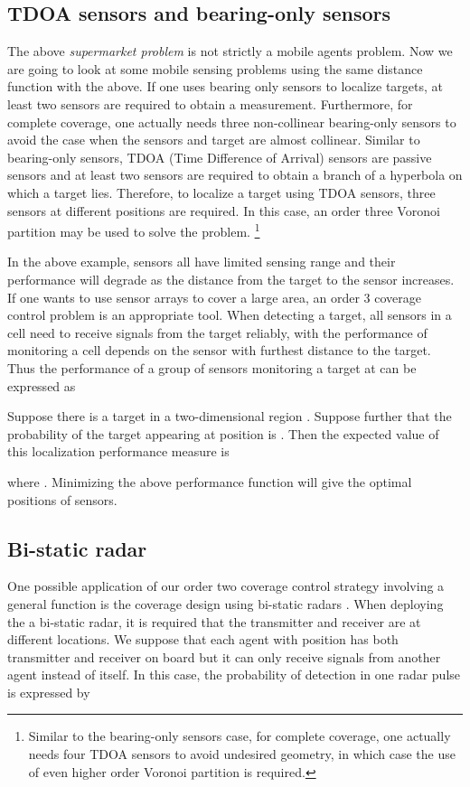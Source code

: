 \documentclass[letterpaper, 10 pt, conference]{ieeeconf}
\begin{document}
\subsection{TDOA sensors and bearing-only sensors}
The above \textit{supermarket problem} is not strictly a mobile agents problem. Now we are going to look at some mobile sensing problems using the same distance function with the above.
If one uses bearing only sensors to localize targets, at least two sensors are required to obtain a measurement. Furthermore, for complete coverage, one actually needs three non-collinear bearing-only sensors to avoid the case when the sensors and target are almost collinear.
Similar to bearing-only sensors, TDOA (Time Difference of Arrival) sensors are passive sensors and at least two sensors are required to obtain a branch of a hyperbola on which a target lies. Therefore, to localize a target using TDOA sensors, three sensors at different positions are required. In this case, an order three Voronoi partition may be used to solve the problem.
\footnote{Similar to the bearing-only sensors case, for complete coverage, one actually needs four TDOA sensors to avoid undesired geometry, in which case the use of even higher order Voronoi partition is required. }


In the above example, sensors all have limited sensing range and their performance will degrade as the distance from the target to the sensor increases. If one wants to use sensor arrays to cover a large area, an order 3 coverage control problem is an appropriate tool. When detecting a target, all sensors in a cell need to receive signals from the target reliably, with the performance of monitoring a cell depends on the sensor with furthest distance to the target.  Thus the performance of a group of sensors  monitoring a target at  can be expressed as


Suppose there is a target in a two-dimensional region . Suppose further that the probability of the target appearing at position  is . Then the expected value of this localization performance measure is

where .
Minimizing the above performance function  will give the optimal positions of sensors.

\subsection{Bi-static radar}
One possible application of our order two coverage control strategy involving a general  function is the coverage design using bi-static radars \cite{nezlin2007bistatic}. When deploying the a bi-static radar, it is required that the transmitter and receiver are at different locations. We suppose that each agent with position  has both transmitter and receiver on board but it can only receive signals from another agent instead of itself. In this case, the probability of detection in one radar pulse is expressed by
\end{document}
